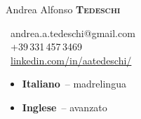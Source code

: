 \begin{minipage}[t]{0.33\textwidth} %
\colorbox{cvblue}{\begin{minipage}[t][5mm][t]{\textwidth}\null\hfill\null\end{minipage}}

\vspace{-.2ex} 						%
\colorbox{cvblue!90}{\color{white}  %
	\textwidth\relax		%
	\begin{minipage}[t][293mm][t]{0.82\textwidth}
	\raggedright
	\vspace*{2.5ex}

	\Large Andrea Alfonso \textbf{\textsc{Tedeschi}} \normalsize 

	\begin{center}
	\end{center}

	\vspace*{0.0ex} %

	\small %
	\MVAt\ {\small andrea.a.tedeschi@gmail.com} \\[0.4ex]
	\Telefon\ +39\,331\,457\,3469 \\[0.5ex]
	\faLinkedin\ \href{https://www.linkedin.com/in/aatedeschi/}{linkedin.com/in/aatedeschi/} \\[0.1ex]

	

	\begin{itemize}
		\item \textbf{Italiano}~-- madrelingua \\
		\item \textbf{Inglese}~-- avanzato \\
	\end{itemize} 


\end{minipage}}
\end{minipage}
